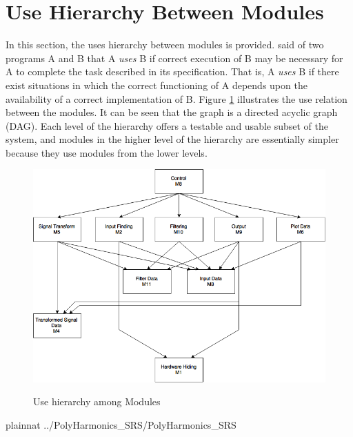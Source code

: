 \documentclass[12pt]{article}
\begin{document}
\section{Use Hierarchy Between Modules} \label{SecUse}

In this section, the uses hierarchy between modules is
provided. \citet{Parnas1978} said of two programs A and B that A {\em uses} B if
correct execution of B may be necessary for A to complete the task described in
its specification. That is, A {\em uses} B if there exist situations in which
the correct functioning of A depends upon the availability of a correct
implementation of B.  Figure \ref{Fig_uses} illustrates the use relation between
the modules. It can be seen that the graph is a directed acyclic graph
(DAG). Each level of the hierarchy offers a testable and usable subset of the
system, and modules in the higher level of the hierarchy are essentially simpler
because they use modules from the lower levels.

\begin{figure}[htbp]
\begin{center}
{
 \includegraphics[scale=0.7,trim=1cm 0 0 0]{use.png}
}
\caption{\label{Fig_uses}Use hierarchy among Modules}
\end{center}
\end{figure}



 {plainnat}
 {../PolyHarmonics_SRS/PolyHarmonics_SRS}
\end{document}
